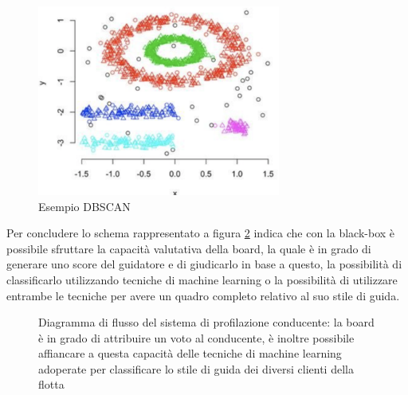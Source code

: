 \documentclass[12pt, a4paper, italian]{report}
\numberwithin{figure}{chapter}
\numberwithin{table}{chapter}
\begin{document}
\begin{figure}[h] \centering
\includegraphics[width=8cm]{C_Density.png}
\caption{Esempio DBSCAN\protect\footnotemark}
\label{fig:density clustering}
\end{figure}

\vspace{2cm}
Per concludere lo schema rappresentato a figura \ref{fig:ProfilazioneML} indica che con la black-box è possibile sfruttare la capacità valutativa della board, la quale è in grado di generare uno score del guidatore e di giudicarlo in base a questo, la possibilità di classificarlo utilizzando tecniche di machine learning o la possibilità di utilizzare entrambe le tecniche per avere un quadro completo relativo al suo stile di guida.

\vspace{0.5cm}
\begin{figure}[h]
\centering
{}
\caption{Diagramma di flusso del sistema di profilazione conducente: la board è in grado di attribuire un voto al conducente, è inoltre possibile affiancare a questa capacità delle tecniche di machine learning adoperate per classificare lo stile di guida dei diversi clienti della flotta}
\label{fig:ProfilazioneML}
\end{figure}
\end{document}
